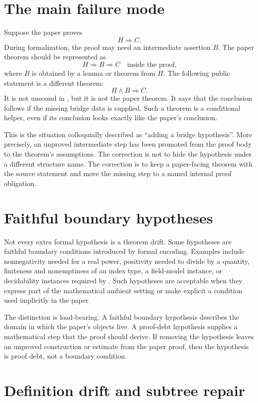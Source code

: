 \documentclass[11pt]{article}
\begin{document}
\section{The main failure mode}

Suppose the paper proves
\[
  H \Longrightarrow C.
\]
During formalization, the proof may need an intermediate assertion \(B\).  The
paper theorem should be represented as
\[
  H \Longrightarrow B \Longrightarrow C
  \quad\text{inside the proof,}
\]
where \(B\) is obtained by a lemma or theorem from \(H\).  The following
public statement is a different theorem:
\[
  H \land B \Longrightarrow C.
\]
It is not unsound in \Lean{}, but it is not the paper theorem.  It says that the
conclusion follows if the missing bridge data is supplied.  Such a theorem is a
conditional helper, even if its conclusion looks exactly like the paper's
conclusion.

This is the situation colloquially described as ``adding a bridge
hypothesis''.  More precisely, an unproved intermediate step has been promoted
from the proof body to the theorem's assumptions.  The correction is not to hide
the hypothesis under a different structure name.  The correction is to keep a
paper-facing theorem with the source statement and move the missing step to a
named internal proof obligation.

\section{Faithful boundary hypotheses}

Not every extra formal hypothesis is a theorem drift.  Some hypotheses are
faithful boundary conditions introduced by formal encoding.  Examples include
nonnegativity needed for a real power, positivity needed to divide by a
quantity, finiteness and nonemptiness of an index type, a field-model instance,
or decidability instances required by \Lean{}.  Such hypotheses are acceptable
when they express part of the mathematical ambient setting or make explicit a
condition used implicitly in the paper.

The distinction is load-bearing.  A faithful boundary hypothesis describes the
domain in which the paper's objects live.  A proof-debt hypothesis supplies a
mathematical step that the proof should derive.  If removing the hypothesis
leaves an unproved construction or estimate from the paper proof, then the
hypothesis is proof debt, not a boundary condition.

\section{Definition drift and subtree repair}
\end{document}
